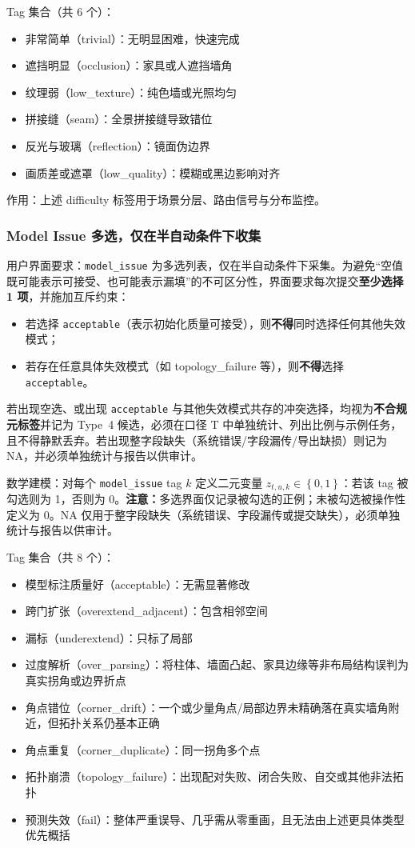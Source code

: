 Tag 集合（共 6 个）：
\begin{itemize}
    \item 非常简单（trivial）：无明显困难，快速完成
    \item 遮挡明显（occlusion）：家具或人遮挡墙角
    \item 纹理弱（low\_texture）：纯色墙或光照均匀
    \item 拼接缝（seam）：全景拼接缝导致错位
    \item 反光与玻璃（reflection）：镜面伪边界
    \item 画质差或遮罩（low\_quality）：模糊或黑边影响对齐
\end{itemize}

作用：上述 difficulty 标签用于场景分层、路由信号与分布监控。
\subsubsection{Model Issue 多选，仅在半自动条件下收集}
用户界面要求：\texttt{model\_issue} 为多选列表，仅在半自动条件下采集。为避免“空值既可能表示可接受、也可能表示漏填”的不可区分性，界面要求每次提交\textbf{至少选择 1 项}，并施加互斥约束：
\begin{itemize}
    \item 若选择 \texttt{acceptable}（表示初始化质量可接受），则\textbf{不得}同时选择任何其他失效模式；
    \item 若存在任意具体失效模式（如 topology\_failure 等），则\textbf{不得}选择 \texttt{acceptable}。
\end{itemize}
若出现空选、或出现 \texttt{acceptable} 与其他失效模式共存的冲突选择，均视为\textbf{不合规元标签}并记为 Type~4 候选，必须在口径 T 中单独统计、列出比例与示例任务，且不得静默丢弃。若出现整字段缺失（系统错误/字段漏传/导出缺损）则记为 NA，并必须单独统计与报告以供审计。

数学建模：对每个 \texttt{model\_issue} tag $k$ 定义二元变量 $z_{t,u,k}\in\left\{0,1\right\}$：若该 tag 被勾选则为 1，否则为 0。\textbf{注意：}多选界面仅记录被勾选的正例；未被勾选被操作性定义为 0。NA 仅用于整字段缺失（系统错误、字段漏传或提交缺失），必须单独统计与报告以供审计。

Tag 集合（共 8 个）：
\begin{itemize}
    \item 模型标注质量好（acceptable）：无需显著修改
    \item 跨门扩张（overextend\_adjacent）：包含相邻空间
    \item 漏标（underextend）：只标了局部
    \item 过度解析（over\_parsing）：将柱体、墙面凸起、家具边缘等非布局结构误判为真实拐角或边界折点
    \item 角点错位（corner\_drift）：一个或少量角点/局部边界未精确落在真实墙角附近，但拓扑关系仍基本正确
    \item 角点重复（corner\_duplicate）：同一拐角多个点
    \item 拓扑崩溃（topology\_failure）：出现配对失败、闭合失败、自交或其他非法拓扑
    \item 预测失效（fail）：整体严重误导、几乎需从零重画，且无法由上述更具体类型优先概括
\end{itemize}

